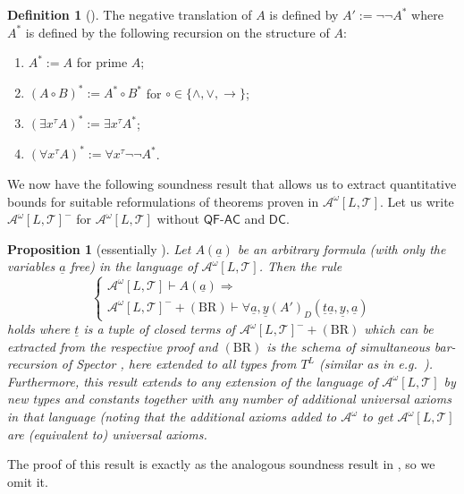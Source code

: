 \documentclass[11pt]{amsart}
\newtheorem{proposition}[theorem]{Proposition}
\theoremstyle{definition}
\newtheorem{definition}[theorem]{Definition}
\theoremstyle{remark}
\newcommand{\QFAC}{\textsf{QF}\mbox{-}\textsf{AC}}
\newcommand{\DC}{\textsf{DC}}
\begin{document}
\begin{definition}[\cite{Kur1951}]
The negative translation of $A$ is defined by $A':=\neg\neg A^*$ where $A^*$ is defined by the following recursion on the structure of $A$:
\begin{enumerate}
\item $A^*:= A$ for prime $A$;
\item $(A\circ B)^*:= A^*\circ B^*$ for $\circ\in\{\land,\lor,\rightarrow\}$;
\item $(\exists x^\tau A)^*:=\exists x^\tau A^*$;
\item $(\forall x^\tau A)^*:=\forall x^\tau \neg\neg A^*$.
\end{enumerate}
\end{definition}
We now have the following soundness result that allows us to extract quantitative bounds for suitable reformulations of theorems proven in $\mathcal{A}^\omega[L,\mathcal{T}]$. Let us write $\mathcal{A}^\omega[L,\mathcal{T}]^-$ for $\mathcal{A}^\omega[L,\mathcal{T}]$ without $\QFAC$ and $\DC$.

\begin{proposition}
[essentially \cite{kohlenbach2005some}]\label{lem:ndinterpretation}
Let $A(\underline{a})$ be an arbitrary formula (with only the variables $\underline{a}$ free) in the language of $\mathcal{A}^\omega[L,\mathcal{T}]$. Then the rule
\[
\begin{cases}\mathcal{A}^\omega[L,\mathcal{T}]\vdash A(\underline{a})\Rightarrow\\
\mathcal{A}^\omega[L,\mathcal{T}]^-+(\mathrm{BR})\vdash\forall\underline{a},\underline{y}(A')_D(\underline{t}\underline{a},\underline{y},\underline{a})\end{cases}
\]
holds where $\underline{t}$ is a tuple of closed terms of $\mathcal{A}^\omega[L,\mathcal{T}]^-+(\mathrm{BR})$ which can be extracted from the respective proof and $(\mathrm{BR})$ is the schema of \emph{simultaneous bar-recursion} of Spector \cite{Spe1962}, here extended to all types from $T^{L}$ (similar as in e.g.\ \cite{Kohlenbach2008}). Furthermore, this result extends to any extension of the language of $\mathcal{A}^\omega[L,\mathcal{T}]$ by new types and constants together with any number of additional universal axioms in that language (noting that the additional axioms added to $\mathcal{A}^\omega$ to get $\mathcal{A}^\omega[L,\mathcal{T}]$ are (equivalent to) universal axioms.
\end{proposition}
The proof of this result is exactly as the analogous soundness result in \cite{kohlenbach2005some}, so we omit it.
\end{document}
